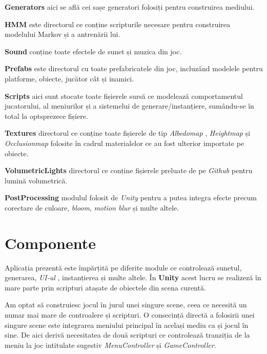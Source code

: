 \textbf{Generators} aici se află cei sașe generatori folosiți pentru construirea mediului.\par

\textbf{HMM} este directorul ce conține scripturile necesare pentru construirea modelului Markov și a antrenării lui.\par

\textbf{Sound} conține toate efectele de sunet și muzica din joc.\par

\textbf{Prefabs} este directorul cu toate prefabricatele din joc, incluzând modelele pentru platforme, obiecte, jucător cât și inamici.

\textbf{Scripts} aici sunt stocate toate fișierele sursă ce modelează comportamentul jucatorului, al meniurilor și a sistemelui de generare/instanțiere, sumându-se în total la optsprezece fișiere.\par

\textbf{Textures} directorul ce conține toate fișierele de tip \textit{Albedomap} , \textit{Heightmap} și \textit{Occlusionmap} folosite în cadrul materialelor ce au fost ulterior importate pe obiecte.\par

\textbf{VolumetricLights} directorul ce conține fișierele preluate de pe \textit{Github} pentru lumină volumetrică.\par

\textbf{PostProcessing} modulul folosit de \textit{Unity} pentru a putea integra efecte precum corectare de culoare, \textit{bloom}, \textit{motion blur} și multe altele.\par


\section{Componente}
Aplicația prezentă este împărțită pe diferite module ce controlează sunetul, generarea, \textit{UI-ul} , instanțierea și multe altele. În \textbf{Unity} acest lucru se realizeză în mare parte prin scripturi atașate de obiectele din scena curentă. \par
Am optat să construiesc jocul în jurul unei singure scene, ceea ce necesită un numar mai mare de controalere și scripturi. O consecință directă a folosirii unei singure scene este integrarea meniului principal în același mediu ca și jocul în sine. De aici derivă necesitatea de două scripturi ce controlează tranziția de la meniu la joc intitulate sugestiv \textit{MenuController} și \textit{GameController}.\par

